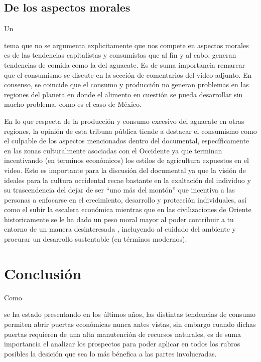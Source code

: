 \documentclass[stu, 12pt, letterpaper, donotrepeattitle, floatsintext, natbib]{apa7}
\begin{document}
\subsection{De los aspectos morales}
Un \begin{justifying}
   tema que no se argumenta explicitamente que nos compete en aspectos morales es de las tendencias capitalistas y consumistas que al fín y al cabo, generan tendencias de comida como la del aguacate. Es de suma importancia remarcar que el consumismo
   se discute en la sección de comentarios del video adjunto. En consenso, se coincide que el consumo y producción no generan problemas en las regiones del planeta en donde el alimento en cuestión se pueda desarrollar sin mucho problema, como es el caso de México.\par
   \vspace{\baselineskip}
   En lo que respecta de la producción y consumo excesivo del aguacate en otras regiones, la opinión de esta tribuna pública tiende a destacar el consumismo como el culpable de los aspectos mencionados dentro del documental, específicamente en las zonas culturalmente asociadas con el Occidente
   ya que terminan incentivando (en terminos económicos) los estilos de agricultura expuestos en el video.
   Esto es importante para la discusión del documental ya que la visión de ideales para la cultura occidental recae bastante en la exaltación del individuo y su trascendencia del dejar de ser ``uno más del montón'' que incentiva a las personas a enfocarse en el crecimiento, desarrollo y protección individuales, así como el 
   subir la escalera económica mientras que en las civilizaciones de Oriente historicamente se le ha dado un peso moral mayor al poder contribuir a tu entorno de un manera desinteresada \citep{unknown-author-2020}, incluyendo al cuidado del ambiente y procurar un desarrollo sustentable (en términos modernos).\par
\end{justifying}
\vspace{\baselineskip}
\section{Conclusión}
Como \begin{justifying}
   se ha estado presentando en los últimos años, las distintas tendencias de consumo permiten abrir puertas económicas nunca antes vistas, sin embargo cuando dichas puertas requieren de una alta manutención de recursos naturales, es de suma importancia el analizar los prospectos 
   para poder aplicar en todos los rubros posibles la desición que sea lo más bénefica a las partes involucradas.\par
\end{justifying}

\newpage
\setcounter{secnumdepth}{0} %
\renewcommand\refname{\textbf{Referencias}}

\end{document}
